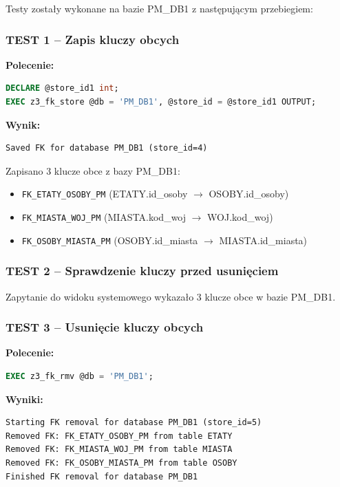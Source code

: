\documentclass[a4paper,11pt]{article}
\begin{document}
	Testy zostały wykonane na bazie PM\_DB1 z następującym przebiegiem:
	
	\subsubsection{TEST 1 -- Zapis kluczy obcych}
	
	\textbf{Polecenie:}
	\begin{lstlisting}[language=SQL]
DECLARE @store_id1 int;
EXEC z3_fk_store @db = 'PM_DB1', @store_id = @store_id1 OUTPUT;
	\end{lstlisting}
	
	\textbf{Wynik:}
	\begin{lstlisting}
Saved FK for database PM_DB1 (store_id=4)
	\end{lstlisting}
	
	Zapisano 3 klucze obce z bazy PM\_DB1:
	\begin{itemize}
		\item \texttt{FK\_ETATY\_OSOBY\_PM} (ETATY.id\_osoby $\to$ OSOBY.id\_osoby)
		\item \texttt{FK\_MIASTA\_WOJ\_PM} (MIASTA.kod\_woj $\to$ WOJ.kod\_woj)
		\item \texttt{FK\_OSOBY\_MIASTA\_PM} (OSOBY.id\_miasta $\to$ MIASTA.id\_miasta)
	\end{itemize}
	
	\subsubsection{TEST 2 -- Sprawdzenie kluczy przed usunięciem}
	
	Zapytanie do widoku systemowego wykazało 3 klucze obce w bazie PM\_DB1.
	
	\subsubsection{TEST 3 -- Usunięcie kluczy obcych}
	
	\textbf{Polecenie:}
	\begin{lstlisting}[language=SQL]
EXEC z3_fk_rmv @db = 'PM_DB1';
	\end{lstlisting}
	
	\textbf{Wyniki:}
	\begin{lstlisting}
Starting FK removal for database PM_DB1 (store_id=5)
Removed FK: FK_ETATY_OSOBY_PM from table ETATY
Removed FK: FK_MIASTA_WOJ_PM from table MIASTA
Removed FK: FK_OSOBY_MIASTA_PM from table OSOBY
Finished FK removal for database PM_DB1
	\end{lstlisting}
	
\end{document}
